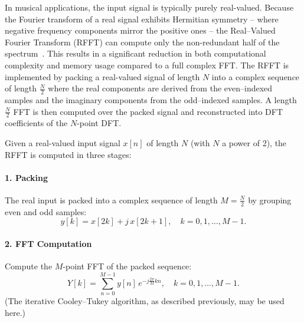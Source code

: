 \documentclass[12pt,letter]{article}
\begin{document}
In musical applications, the input signal is typically purely real-valued.
Because the Fourier transform of a real signal exhibits Hermitian
symmetry -- where negative frequency components mirror the positive ones --
the Real--Valued Fourier Transform (RFFT) can compute only the non-redundant
half of the spectrum~\citep{sorensen1987real}. This results in a significant
reduction in both computational complexity and memory usage compared to a
full complex FFT. The RFFT is implemented by packing a real-valued signal of
length $N$ into a complex sequence of length $\frac{N}{2}$ where the real
components are derived from the even--indexed samples and the imaginary
components from the odd--indexed samples. A length $\frac{N}{2}$ FFT is then
computed over the packed signal and reconstructed into DFT coefficients of
the $N$-point DFT.

Given a real-valued input signal $x[n]$ of length $N$ (with $N$ a power of 2),
the RFFT is computed in three stages:

\paragraph{1. Packing}
The real input is packed into a complex sequence of length $M = \frac{N}{2}$
by grouping even and odd samples:
\begin{equation}
y[k] = x[2k] + j\,x[2k+1], \quad k = 0, 1, \dots, M-1.
\label{eq:packing}
\end{equation}

\paragraph{2. FFT Computation}
Compute the $M$-point FFT of the packed sequence:
\begin{equation}
Y[k] = \sum_{n=0}^{M-1} y[n] \, e^{-j \frac{2\pi}{M} k n}, \quad k = 0, 1, \dots, M-1.
\label{eq:fft-computation}
\end{equation}
(The iterative Cooley–Tukey algorithm, as described previously, may be used
here.)
\end{document}
